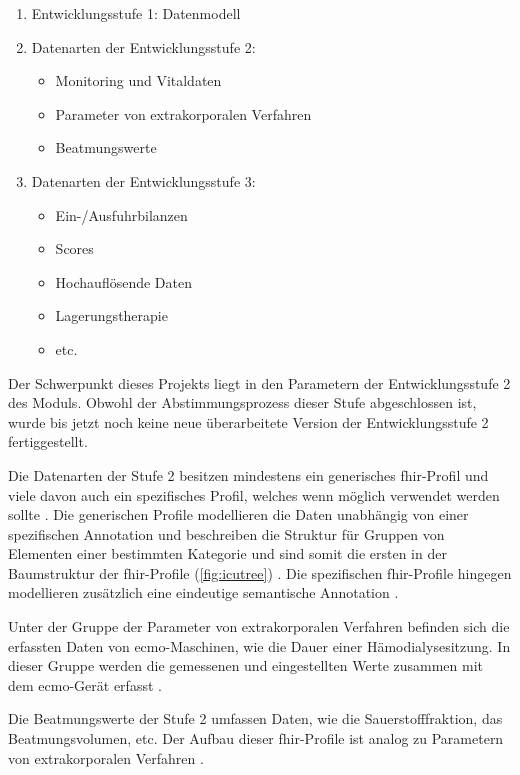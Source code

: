 \begin{enumerate}
	\item Entwicklungsstufe 1: Datenmodell
	\item Datenarten der Entwicklungsstufe 2:
	\begin{itemize}
		\item Monitoring und Vitaldaten
		\item Parameter von extrakorporalen Verfahren
		\item Beatmungswerte
	\end{itemize}
	\item Datenarten der Entwicklungsstufe 3:
	\begin{itemize}
		\item Ein-/Ausfuhrbilanzen
		\item Scores
		\item Hochauflösende Daten
		\item Lagerungstherapie
		\item etc.
	\end{itemize}
\end{enumerate}

 Der Schwerpunkt dieses Projekts liegt in den Parametern der Entwicklungsstufe 2 des Moduls. Obwohl der Abstimmungsprozess dieser Stufe abgeschlossen ist, wurde bis jetzt noch keine neue überarbeitete Version der Entwicklungsstufe 2 fertiggestellt.

 Die Datenarten der Stufe 2 besitzen mindestens ein generisches \ac{fhir}-Profil und viele davon auch ein spezifisches Profil, welches wenn möglich verwendet werden sollte \cite{icukdz, modicuvid}. Die generischen Profile modellieren die Daten unabhängig von einer spezifischen Annotation und beschreiben die Struktur für Gruppen von Elementen einer bestimmten Kategorie und sind somit die ersten in der Baumstruktur der \ac{fhir}-Profile (\ref{fig:icutree}) \cite{icukdz}. Die spezifischen \ac{fhir}-Profile hingegen modellieren zusätzlich eine eindeutige semantische Annotation \cite{modicuvid}.
 
 Unter der Gruppe der Parameter von extrakorporalen Verfahren befinden sich die erfassten Daten von \ac{ecmo}-Maschinen, wie die Dauer einer Hämodialysesitzung. In dieser Gruppe werden die gemessenen und eingestellten Werte zusammen mit dem \ac{ecmo}-Gerät erfasst \cite{icukdz}. 
 
 Die Beatmungswerte der Stufe 2 umfassen Daten, wie die Sauerstofffraktion, das Beatmungsvolumen, etc. Der Aufbau dieser \ac{fhir}-Profile ist analog zu Parametern von extrakorporalen Verfahren \cite{icukdz}.

